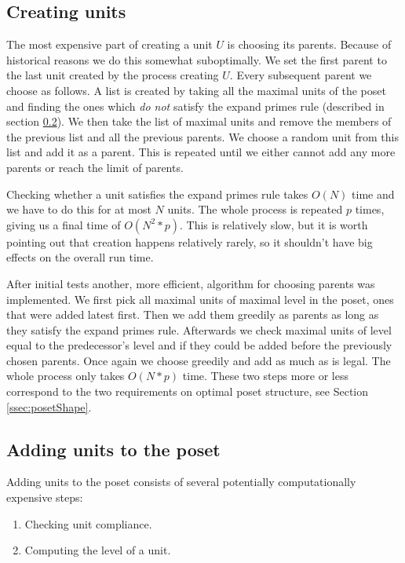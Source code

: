 \documentclass[a4paper,10pt]{article}
\begin{document}
		\subsection{Creating units}
			The most expensive part of creating a unit $U$ is choosing its parents. Because of historical reasons we do this somewhat suboptimally.
			We set the first parent to the last unit created by the process creating $U$. Every subsequent parent we choose as follows.
			A list is created by taking all the maximal units of the poset and finding the ones which \emph{do not} satisfy the expand primes rule (described in section \ref{sec:adding}).
			We then take the list of maximal units and remove the members of the previous list and all the previous parents.
			We choose a random unit from this list and add it as a parent. This is repeated until we either cannot add any more parents or reach the limit of parents.

			Checking whether a unit satisfies the expand primes rule takes $O(N)$ time and we have to do this for at most $N$ units.
			The whole process is repeated $p$ times, giving us a final time of $O(N^2*p)$.
			This is relatively slow, but it is worth pointing out that creation happens relatively rarely, so it shouldn't have big effects on the overall run time.

			After initial tests another, more efficient, algorithm for choosing parents was implemented.
			We first pick all maximal units of maximal level in the poset, ones that were added latest first.
			Then we add them greedily as parents as long as they satisfy the expand primes rule.
			Afterwards we check maximal units of level equal to the predecessor's level and if they could be added before the previously chosen parents.
			Once again we choose greedily and add as much as is legal. The whole process only takes $O(N*p)$ time.
			These two steps more or less correspond to the two requirements on optimal poset structure, see Section \ref{ssec:posetShape}.
		\subsection{Adding units to the poset}
		 \label{sec:adding}
		 Adding units to the poset consists of several potentially computationally expensive steps:
			\begin{enumerate}
				\item Checking unit compliance.
				\item Computing the level of a unit.
			\end{enumerate}
\end{document}
